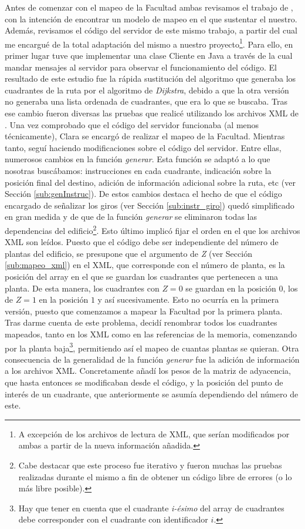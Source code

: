 Antes de comenzar con el mapeo de la Facultad ambas revisamos el trabajo de \cite{TFGguia}, con la intención de encontrar un modelo de mapeo en el que sustentar el nuestro. Además, revisamos el código del servidor de este mismo trabajo, a partir del cual me encargué de la total adaptación del mismo a nuestro proyecto\footnote{A excepción de los archivos de lectura de XML, que serían modificados por ambas a partir de la nueva información añadida.}. Para ello, en primer lugar tuve que implementar una clase Cliente en Java a través de la cual mandar mensajes al servidor para observar el funcionamiento del código. El resultado de este estudio fue la rápida sustitución del algoritmo que generaba los cuadrantes de la ruta por el algoritmo de \textit{Dijkstra}, debido a que la otra versión no generaba una lista ordenada de cuadrantes, que era lo que se buscaba. Tras ese cambio fueron diversas las pruebas que realicé utilizando los archivos XML de \cite{TFGguia}. Una vez comprobado que el código del servidor funcionaba (al menos técnicamente), Clara se encargó de realizar el mapeo de la Facultad. Mientras tanto, seguí haciendo modificaciones sobre el código del servidor. Entre ellas, numerosos cambios en la función \textit{generar}. Esta función se adaptó a lo que nosotras buscábamos: instrucciones en cada cuadrante, indicación sobre la posición final del destino, adición de información adicional sobre la ruta, etc (ver Sección \ref{sub:genInstruc}). De estos cambios destaca el hecho de que el código encargado de señalizar los giros (ver Sección \ref{sub:instr_giro}) quedó simplificado en gran medida y de que de la función \textit{generar} se eliminaron todas las dependencias del edificio\footnote{Cabe destacar que este proceso fue iterativo y fueron muchas las pruebas realizadas durante el mismo a fin de obtener un código libre de errores (o lo más libre posible).}. Esto último implicó fijar el orden en el que los archivos XML son leídos. Puesto que el código debe ser independiente del número de plantas del edificio, se presupone que el argumento de \textit{Z} (ver Sección \ref{sub:mapeo_xml}) en el XML, que corresponde con el número de planta, es la posición del array en el que se guardan los cuadrantes que pertenecen a una planta. De esta manera, los cuadrantes con $Z = 0$ se guardan en la posición $0$, los de $Z = 1$ en la posición $1$ y así sucesivamente. Esto no ocurría en la primera versión, puesto que comenzamos a mapear la Facultad por la primera planta. Tras darme cuenta de este problema, decidí renombrar todos los cuadrantes mapeados, tanto en los XML como en las referencias de la memoria, comenzando por la planta baja\footnote{Hay que tener en cuenta que el cuadrante \textit{i-ésimo} del array de cuadrantes debe corresponder con el cuadrante con identificador $i$.}, permitiendo así el mapeo de cuantas plantas se quieran. Otra consecuencia de la generalidad de la función \textit{generar} fue la adición de información a los archivos XML. Concretamente añadí los pesos de la matriz de adyacencia, que hasta entonces se modificaban desde el código, y la posición del punto de interés de un cuadrante, que anteriormente se asumía dependiendo del número de este. 

